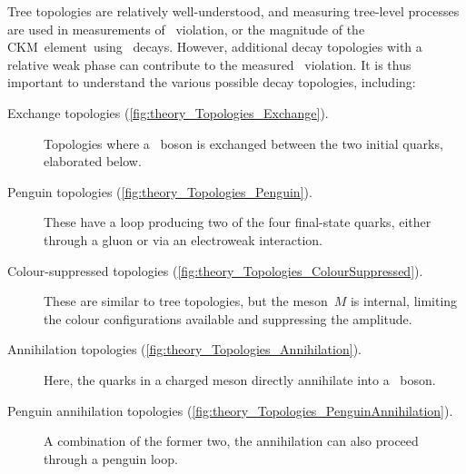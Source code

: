 Tree topologies are relatively well-understood, and measuring tree-level processes are used in measurements of \CP~violation, or the magnitude of the CKM~element~\Vub using \decay{\bquark}{\uquark}~decays.
However, additional decay topologies with a relative weak phase can contribute to the measured \CP~violation.
It is thus important to understand the various possible decay topologies, including:
%
\begin{description}
    \item[Exchange topologies (\cref{fig:theory_Topologies_Exchange}).] Topologies where a \Wpm~boson is exchanged between the two initial quarks, elaborated below.
    \item[Penguin topologies (\cref{fig:theory_Topologies_Penguin}).] These have a loop producing two of the four final-state quarks, either through a gluon or via an electroweak interaction.
    \item[Colour-suppressed topologies (\cref{fig:theory_Topologies_ColourSuppressed}).] These are similar to tree topologies, but the meson~\(M\) is internal, limiting the colour configurations available and suppressing the amplitude.
    \item[Annihilation topologies (\cref{fig:theory_Topologies_Annihilation}).] Here, the quarks in a charged meson directly annihilate into a \Wpm~boson.
    \item[Penguin annihilation topologies (\cref{fig:theory_Topologies_PenguinAnnihilation}).] A combination of the former two, the annihilation can also proceed through a penguin loop.
\end{description}
%
